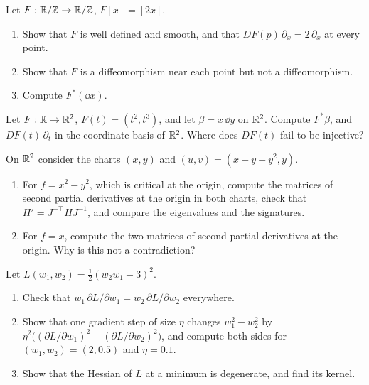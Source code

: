 \begin{notechapter}
\begin{exercise}\label{tangent-bundles:exr:6}
Let $F:\mathbb{R}/\mathbb{Z}\to\mathbb{R}/\mathbb{Z}$, $F[x] = [2x]$.
\begin{enumerate}[nosep]
  \item Show that $F$ is well defined and smooth, and that
        $DF(p)\,\partial_x = 2\,\partial_x$ at every point.
  \item Show that $F$ is a diffeomorphism near each point but not a
        diffeomorphism.
  \item Compute $F^*(\dd x)$.
\end{enumerate}
\end{exercise}

\begin{exercise}\label{tangent-bundles:exr:7}
Let $F:\mathbb{R}\to\mathbb{R}^2$, $F(t) = (t^2, t^3)$, and let $\beta = x\,\dd y$ on
$\mathbb{R}^2$. Compute $F^*\beta$, and $DF(t)\,\partial_t$ in the coordinate
basis of $\mathbb{R}^2$. Where does $DF(t)$ fail to be injective?
\end{exercise}

\begin{exercise}\label{tangent-bundles:exr:8}
On $\mathbb{R}^2$ consider the charts $(x, y)$ and
$(u, v) = (x + y + y^2, y)$.
\begin{enumerate}[nosep]
  \item For $f = x^2 - y^2$, which is critical at the origin, compute
        the matrices of second partial derivatives at the origin in both
        charts, check that $H' = J^{-\top}HJ^{-1}$, and compare the
        eigenvalues and the signatures.
  \item For $f = x$, compute the two matrices of second partial
        derivatives at the origin. Why is this not a contradiction?
\end{enumerate}
\end{exercise}

\begin{exercise}\label{tangent-bundles:exr:9}
Let $L(w_1, w_2) = \frac12(w_2w_1 - 3)^2$.
\begin{enumerate}[nosep]
  \item Check that $w_1\,\partial L/\partial w_1
        = w_2\,\partial L/\partial w_2$ everywhere.
  \item Show that one gradient step of size $\eta$ changes
        $w_1^2 - w_2^2$ by
        $\eta^2\bigl((\partial L/\partial w_1)^2
        - (\partial L/\partial w_2)^2\bigr)$, and compute both sides for
        $(w_1, w_2) = (2, 0.5)$ and $\eta = 0.1$.
  \item Show that the Hessian of $L$ at a minimum is degenerate, and
        find its kernel.
\end{enumerate}
\end{exercise}
\end{notechapter}

